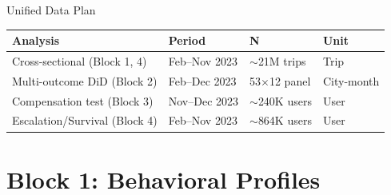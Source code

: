 \documentclass[aspectratio=169, 11pt]{beamer}
\begin{document}
\begin{frame}{Unified Data Plan}
\small
\begin{table}
\centering
\begin{tabular}{@{}llll@{}}
\toprule
\textbf{Analysis} & \textbf{Period} & \textbf{N} & \textbf{Unit} \\
\midrule
\rowcolor{PhaseBlue!8}
Cross-sectional (Block 1, 4) & Feb--Nov 2023 & $\sim$21M trips & Trip \\
\rowcolor{PhaseOrange!8}
Multi-outcome DiD (Block 2) & Feb--Dec 2023 & 53$\times$12 panel & City-month \\
\rowcolor{PhasePurple!8}
Compensation test (Block 3) & Nov--Dec 2023 & $\sim$240K users & User \\
\rowcolor{AccentGreen!8}
Escalation/Survival (Block 4) & Feb--Nov 2023 & $\sim$864K users & User \\
\bottomrule
\end{tabular}
\end{table}

\vspace{0.3cm}
\begin{center}
\end{center}
\end{frame}

\section{Block 1: Behavioral Profiles}
\end{document}
